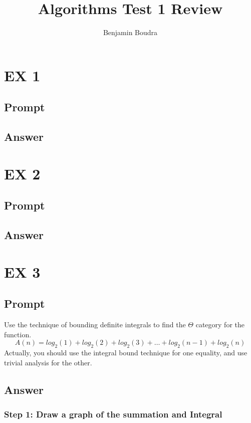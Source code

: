 \documentclass[10pt,a4paper]{article}
\title{Algorithms Test 1 Review}
\author{Benjamin Boudra}
\begin{document}
\maketitle
\tableofcontents
\section{EX 1}
\subsection{Prompt}
\subsection{Answer}

\section{EX 2}
\subsection{Prompt}
\subsection{Answer}

\section{EX 3}
\subsection{Prompt}
Use the technique of bounding definite integrals to find the $\Theta$ category for the function.
\begin{equation}
  A (n) = log_2(1) + log_2(2) + log_2(3) + \ldots + log_2(n-1) + log_2(n)
\end{equation}
Actually, you should use the integral bound technique for one equality, and use trivial analysis for the other.
\subsection{Answer}
\subsubsection{Step 1: Draw a graph of the summation and Integral}
\end{document}
